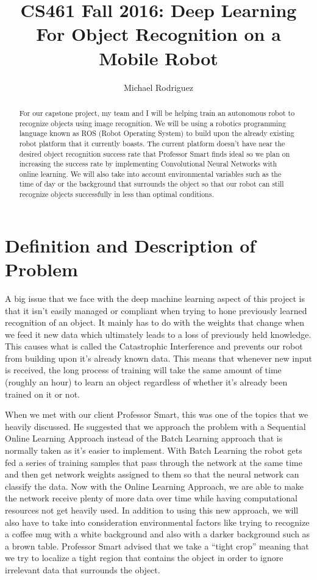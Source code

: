 \documentclass[a4paper, 10pt]{article}
\title{CS461 Fall 2016: Deep Learning For Object Recognition on a Mobile Robot}
\author{Michael Rodriguez}
\begin{document}
\maketitle 

\begin{abstract}
For our capstone project, my team and I will be helping train an autonomous robot to recognize objects using image recognition. We will be using a robotics programming language known as ROS (Robot Operating System) to build upon the already existing robot platform that it currently boasts. The current platform doesn’t have near the desired object recognition success rate that Professor Smart finds ideal so we plan on increasing the success rate by implementing Convolutional Neural Networks with online learning. We will also take into account environmental variables such as the time of day or the background that surrounds the object so that our robot can still recognize objects successfully in less than optimal conditions.
\end{abstract}

\newpage

\section{Definition and Description of Problem}

A big issue that we face with the deep machine learning aspect of this project is that it isn’t easily managed or compliant when trying to hone previously learned recognition of an object. It mainly has to do with the weights that change when we feed it new data which ultimately leads to a loss of previously held knowledge. This causes what is called the Catastrophic Interference and prevents our robot from building upon it’s already known data. This means that whenever new input is received, the long process of training will take the same amount of time (roughly an hour) to learn an object regardless of whether it’s already been trained on it or not. 

When we met with our client Professor Smart, this was one of the topics that we heavily discussed. He suggested that we approach the problem with a Sequential Online Learning Approach instead of the Batch Learning approach that is normally taken as it’s easier to implement. With Batch Learning the robot gets fed a series of training samples that pass through the network at the same time and then get network weights assigned to them so that the neural network can classify the data. Now with the Online Learning Approach, we are able to make the network receive plenty of more data over time while having computational resources not get heavily used. In addition to using this new approach, we will also have to take into consideration environmental factors like trying to recognize a coffee mug with a white background and also with a darker background such as a brown table. Professor Smart advised that we take a “tight crop” meaning that we try to localize a tight region that contains the object in order to ignore irrelevant data that surrounds the object. 
\end{document}
